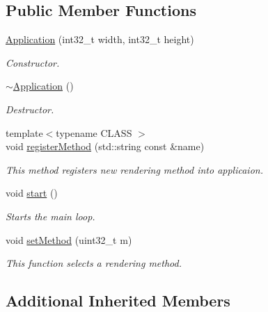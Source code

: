 \subsection*{Public Member Functions}
\begin{DoxyCompactItemize}
\item 
\hyperlink{classApplication_a00f1777a96159f25075927bbe9076696}{Application} (int32\+\_\+t width, int32\+\_\+t height)
\begin{DoxyCompactList}\small\item\em Constructor. \end{DoxyCompactList}\item 
\mbox{\label{classApplication_a748bca84fefb9c12661cfaa2f623748d}} 
\hyperlink{classApplication_a748bca84fefb9c12661cfaa2f623748d}{$\sim$\+Application} ()
\begin{DoxyCompactList}\small\item\em Destructor. \end{DoxyCompactList}\item 
{\footnotesize template$<$typename C\+L\+A\+SS $>$ }\\void \hyperlink{classApplication_a1ad1383c43c8d658761249d5a06e3a88}{register\+Method} (std\+::string const \&name)
\begin{DoxyCompactList}\small\item\em This method registers new rendering method into applicaion. \end{DoxyCompactList}\item 
\mbox{\label{classApplication_aa38ca47b50935092078cef4281ab66bc}} 
void \hyperlink{classApplication_aa38ca47b50935092078cef4281ab66bc}{start} ()
\begin{DoxyCompactList}\small\item\em Starts the main loop. \end{DoxyCompactList}\item 
void \hyperlink{classApplication_a5c018483318ffd6b3121902980e0e122}{set\+Method} (uint32\+\_\+t m)
\begin{DoxyCompactList}\small\item\em This function selects a rendering method. \end{DoxyCompactList}\end{DoxyCompactItemize}
\subsection*{Additional Inherited Members}


